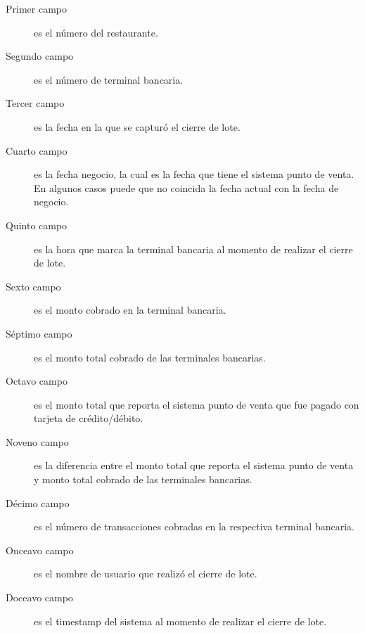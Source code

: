 \begin{description}
 \item[Primer campo] es el número del restaurante.
 \item[Segundo campo] es el número de terminal bancaria.
 \item[Tercer campo] es la fecha en la que se capturó el cierre de lote.
 \item[Cuarto campo] es la fecha negocio, la cual es la fecha que tiene el sistema punto de venta. En algunos casos puede que no coincida la fecha actual con la fecha de negocio.
 \item[Quinto campo] es la hora que marca la terminal bancaria al momento de realizar el cierre de lote.
 \item[Sexto campo] es el monto cobrado en la terminal bancaria.
 \item[Séptimo campo] es el monto total cobrado de las terminales bancarias.
 \item[Octavo campo] es el monto total que reporta el sistema punto de venta que fue pagado con tarjeta de crédito/débito.
 \item[Noveno campo] es la diferencia entre el monto total que reporta el sistema punto de venta y monto total cobrado de las terminales bancarias.
 \item[Décimo campo] es el número de transacciones cobradas en la respectiva terminal bancaria.
 \item[Onceavo campo] es el nombre de usuario que realizó el cierre de lote.
 \item[Doceavo campo] es el timestamp del sistema al momento de realizar el cierre de lote.
\end{description}